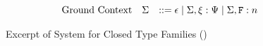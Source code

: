 \documentclass[format=acmsmall,manuscript,review,screen,nonacm,margin=1in,11pt]{acmart}
\begin{document}
\begin{figure}[ht]
\[\begin{array}{l l l l l}
      \\
      &\text{Ground Context} &\GEnv   &\bnfeq \empt \bnfor \GEnv,\Axiom:\AxiomTy
                                        \bnfor \GEnv,\FamCtrs:n\\%
    \end{array}
  \]
  \caption[Excerpt \CLTF{}]{Excerpt of System for Closed Type Families (\CLTF)}
  \label{fig:syntax-tf-closed}
\end{figure}
\end{document}
